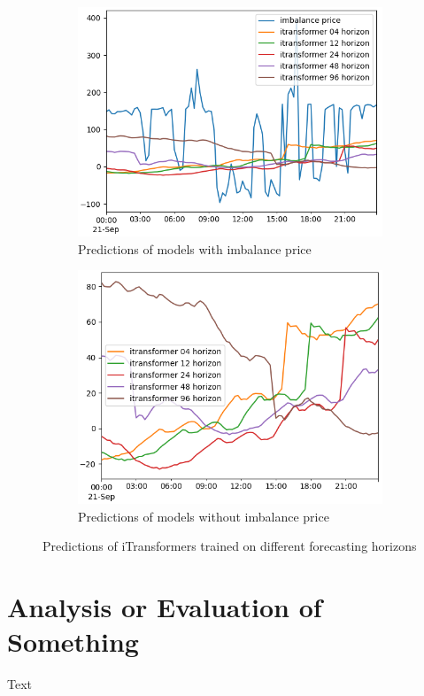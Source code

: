 \documentclass[class=scrbook, crop=false]{standalone}
\begin{document}
\begin{figure}
  \centering
\begin{subfigure}{0.45\textwidth}
  \includegraphics[width=\linewidth]{../images/results/itransformer_horizon_lengths.png}
  \caption{Predictions of models with imbalance price}
  \label{fig:sfig1}
\end{subfigure}
\begin{subfigure}{0.45\textwidth}
  \includegraphics[width=\linewidth]{../images/results/itransformer_horizon_lengths_alone.png}
  \caption{Predictions of models without imbalance price}
  \label{fig:sfig1}
\end{subfigure}
\caption{Predictions of iTransformers trained on different forecasting horizons}
\label{fig:fig}
\end{figure}


\section{Analysis or Evaluation of Something}
\label{Section::Analysis or Evaluation of Something}    
    Text
\end{document}

